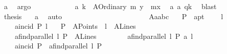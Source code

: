 \begin{isabellebody}
\ a{}\ \isamarkupfalse%
\ argo\isanewline
\ \ \ \ \ \ \ \ \ \ \isamarkupfalse%
\ a{}{\isacharcolon}{\kern0pt}\ {\isachardoublequoteopen}k\ {\isacharequal}{\kern0pt}\ A{}Ordinary\ m\ {\isacharparenleft}{\kern0pt}y{}\ {\isacharminus}{\kern0pt}\ m{\isacharasterisk}{\kern0pt}x{}{\isacharparenright}{\kern0pt}{\isachardoublequoteclose}\ \isamarkupfalse%
\ a{}\ a{}\ qk\ \isamarkupfalse%
\ blast\isanewline
\ \ \ \ \ \ \ \ \ \ \isamarkupfalse%
\ {\isacharquery}{\kern0pt}thesis\ \isamarkupfalse%
\ {}\ a{}\ \isamarkupfalse%
\ auto\isanewline
\ \ \ \ \ \ \ \ \isamarkupfalse%
\isanewline
\ \ \ \ \ \ \isamarkupfalse%
\isanewline
\ \ \ \ \isamarkupfalse%
\isanewline
\ \ \isamarkupfalse%
\isanewline
{}\isamarkupfalse%
%
\endisatagproof
{\isafoldproof}%
%
\isadelimproof
\isanewline
%
\endisadelimproof
\isanewline
\isanewline
\isanewline
{}\isamarkupfalse%
\ A{}{\isacharunderscore}{\kern0pt}a{}abc{\isacharcolon}{\kern0pt}\isanewline
\ \ \ P\ {\isacharcolon}{\kern0pt}{\isacharcolon}{\kern0pt}\ a{}pt\ \isanewline
\ \ \ l\ \isanewline
\ \ \ {\isachardoublequoteopen}{\isasymnot}\ {\isacharparenleft}{\kern0pt}a{}incid\ P\ l{\isacharparenright}{\kern0pt}{\isachardoublequoteclose}\isanewline
\ \ \ {\isachardoublequoteopen}P\ {\isasymin}\ A{}Points{\isachardoublequoteclose}\ \ {\isachardoublequoteopen}l\ {\isasymin}\ A{}Lines{\isachardoublequoteclose}\ \isanewline
\ \ \ \ \isanewline
\ \ \ \ {\isachardoublequoteopen}a{}find{\isacharunderscore}{\kern0pt}parallel\ l\ P\ {\isasymin}\ A{}Lines{\isachardoublequoteclose}\ \ \ \ \isanewline
\ \ \ \ {\isachardoublequoteopen}{\isacharparenleft}{\kern0pt}a{}find{\isacharunderscore}{\kern0pt}parallel\ l\ P{\isacharparenright}{\kern0pt}\ a{}{\isacharbar}{\kern0pt}{\isacharbar}{\kern0pt}\ l{\isachardoublequoteclose}\ \ \isanewline
\ \ \ \ {\isachardoublequoteopen}a{}incid\ P\ \ {\isacharparenleft}{\kern0pt}a{}find{\isacharunderscore}{\kern0pt}parallel\ l\ P{\isacharparenright}{\kern0pt}{\isachardoublequoteclose}\ \ \isanewline

\end{isabellebody}

